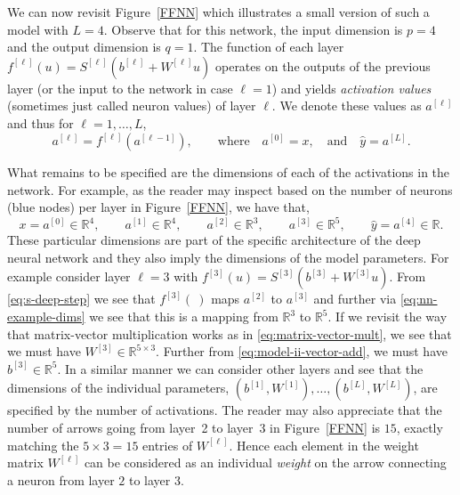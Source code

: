We can now revisit Figure~\ref{FFNN} which illustrates a small version of such a model with $L=4$. Observe that for this network,  the input dimension is $p=4$ and the output dimension is $q=1$. The function of each layer $f^{[\ell]}(u) = S^{[\ell]}(b^{[\ell]} + W^{[\ell]} u)$ operates on the outputs of the previous layer (or the input to the network in case $\ell=1$) and yields {\em activation values} (sometimes just called neuron values) of layer $\ell$. We denote these values as $a^{[\ell]}$ and thus for $\ell=1,\ldots,L$,
%
\begin{equation}
\label{eq:s-deep-step}
a^{[\ell]} = f^{[\ell]}(a^{[\ell-1]}),
\qquad
\textrm{where}
\quad
a^{[0]} = x,
\quad
\text{and}
\quad
\hat{y} = a^{[L]}.
\end{equation}
%

What remains to be specified are the dimensions of each of the activations in the network. For example, as the reader may inspect based on the number of neurons (blue nodes) per layer in Figure~\ref{FFNN}, we have that,
%
\begin{equation}
\label{eq:nn-example-dims}
x = a^{[0]} \in {\mathbb R}^4,
\qquad
a^{[1]} \in {\mathbb R}^4,
\qquad
a^{[2]} \in {\mathbb R}^3,
\qquad
a^{[3]} \in {\mathbb R}^5,
\qquad
\hat{y} = a^{[4]} \in {\mathbb R}.
\end{equation}
%
These particular dimensions are part of the specific architecture of the deep neural network and they also imply the dimensions of the model parameters. For example consider layer $\ell=3$ with $f^{[3]}(u) = S^{[3]}(b^{[3]} + W^{[3]} u)$. From \eqref{eq:s-deep-step} we see that $f^{[3]}(~)$ maps $a^{[2]}$ to $a^{[3]}$ and further via \eqref{eq:nn-example-dims} we see that this is a mapping from ${\mathbb R}^3$ to ${\mathbb R}^5$. If we revisit the way that matrix-vector multiplication works as in \eqref{eq:matrix-vector-mult}, we see that we must have $W^{[3]} \in {\mathbb R^{5 \times 3}}$. Further from \eqref{eq:model-ii-vector-add}, we must have $b^{[3]} \in {\mathbb R}^5$. In a similar manner we can consider other layers and see that the dimensions of the individual parameters, $(b^{[1]}, W^{[1]}), \ldots, (b^{[L]}, W^{[L]})$, are specified by the number of activations. The reader may also appreciate that the number of arrows going from layer~2 to layer~3 in Figure~\ref{FFNN} is $15$, exactly matching the $5\times 3=15$ entries of $W^{[\ell]}$. Hence each element in the weight matrix $W^{[\ell]}$ can be considered as an individual {\em weight} on the arrow connecting a neuron from layer $2$ to layer $3$.

